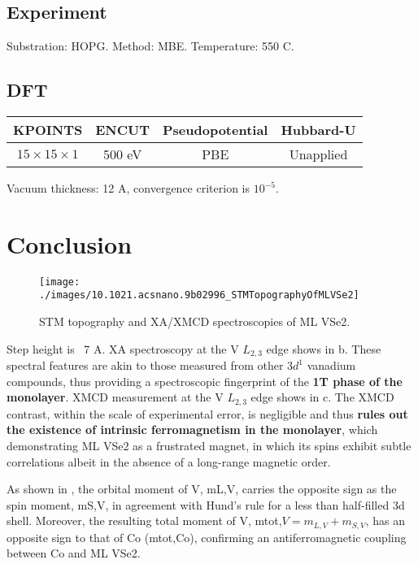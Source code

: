 \subsection{Experiment}
Substration: HOPG. Method: MBE. Temperature: 550 C.

\subsection{DFT}
\begin{table}[h]
    \begin{tabular}{cccc}
    \toprule
    KPOINTS                 & ENCUT  & Pseudopotential & Hubbard-U \\
    \midrule
    $15 \times 15 \times 1$ & 500 eV & PBE             & Unapplied  \\
    \bottomrule
    \end{tabular}
\end{table}
Vacuum thickness: 12 A, convergence criterion is $10^{-5}$.
\section{Conclusion}

\begin{figure}[ht] 
    \texttt{[image: ./images/10.1021.acsnano.9b02996\_STMTopographyOfMLVSe2]}
	\caption[STM topography and XA/XMCD spectroscopies of ML VSe2]{
        STM topography and XA/XMCD spectroscopies of ML VSe2.
	}
\end{figure}

Step height is ~7 A. XA spectroscopy at the V $L_{2,3}$ edge shows in b. These spectral features are akin to those measured from other $3d^1$ vanadium compounds, thus providing a spectroscopic fingerprint of the \textbf{1T phase of the monolayer}. XMCD measurement at the V $L_{2,3}$ edge shows in c. The XMCD contrast, within the scale of experimental error, is negligible and thus \textbf{rules out the existence of intrinsic ferromagnetism in the monolayer}, which demonstrating ML VSe2 as a frustrated magnet, in which its spins exhibit subtle correlations albeit in the absence of a long-range magnetic order.

As shown in , the orbital moment of V, mL,V, carries the opposite sign as the spin moment, mS,V, in agreement with Hund’s rule for a less than half-filled 3d shell. Moreover, the resulting total moment of V, mtot,$V = m_{L,V} + m_{S,V}$, has an opposite sign to that of Co (mtot,Co), confirming an antiferromagnetic coupling between Co and ML VSe2.

